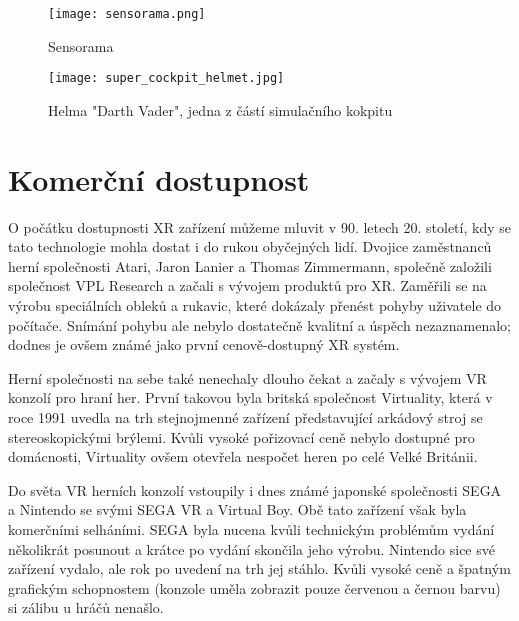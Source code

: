 \begin{figure}[H]
    \centering

    \begin{minipage}{.5\textwidth}
        \centering
        \texttt{[image: sensorama.png]}
        \caption{Sensorama \cite{sensorama_patent}}
        \label{sensorama_fig}
    \end{minipage}%
    \begin{minipage}{.5\textwidth}
        \centering
        \texttt{[image: super\_cockpit\_helmet.jpg]}
        \caption{Helma "Darth Vader", jedna z částí simulačního kokpitu \cite{super_cockpit_image}}
        \label{sensorama}
    \end{minipage}

\end{figure}

\section{Komerční dostupnost}

O počátku dostupnosti XR zařízení můžeme mluvit v 90. letech 20. století, kdy se tato technologie mohla dostat i do rukou obyčejných lidí. Dvojice zaměstnanců herní společnosti Atari, Jaron Lanier a Thomas Zimmermann, společně založili společnost VPL Research a začali s vývojem produktů pro XR. Zaměřili se na výrobu speciálních obleků a rukavic, které dokázaly přenést pohyby uživatele do počítače. Snímání pohybu ale nebylo dostatečně kvalitní a úspěch nezaznamenalo; dodnes je ovšem známé jako první cenově-dostupný XR systém. \cite{otechnice_2}

Herní společnosti na sebe také nenechaly dlouho čekat a začaly s vývojem VR konzolí pro hraní her. První takovou byla britská společnost Virtuality, která v roce 1991 uvedla na trh stejnojmenné zařízení představující arkádový stroj se stereoskopickými brýlemi. Kvůli vysoké pořizovací ceně nebylo dostupné pro domácnosti, Virtuality ovšem otevřela nespočet heren po celé Velké Británii. \cite{otechnice_2} \cite{independent_virtuality}

Do světa VR herních konzolí vstoupily i dnes známé japonské společnosti SEGA a Nintendo se svými SEGA VR a Virtual Boy. Obě tato zařízení však byla komerčními selháními. SEGA byla nucena kvůli technickým problémům vydání několikrát posunout a krátce po vydání skončila jeho výrobu. Nintendo sice své zařízení vydalo, ale rok po uvedení na trh jej stáhlo. Kvůli vysoké ceně a špatným grafickým schopnostem (konzole uměla zobrazit pouze červenou a černou barvu) si zálibu u hráčů nenašlo.\cite{otechnice_2}

